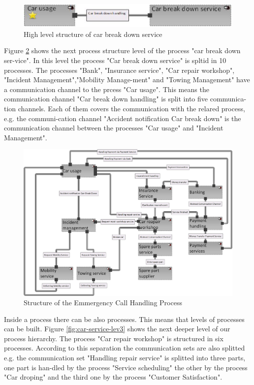 \begin{figure}[htbp]
	\centering
	\includegraphics[width=0.7\linewidth]{Figures/Chapter5/figures-hierarchy/Car-Service-Level1.jpg}
	\caption[High level structure of car break down service]{High level structure of car break down service}
	\label{fig:car-service-level1}
\end{figure}



Figure \ref{fig:car-service-leve2} shows the next process structure level of the process "car break down ser-vice". In this level the process "Car break down service" is spltid in 10 processes. The processes "Bank", "Insurance service", "Car repair workshop", "Incident Management","Mobility Manage-ment" and "Towing Management" have a communication channel to the prcess "Car usage". This means the communication channel "Car break down handling" is split into five communica-tion channels. Each of them covers the communication with the relared process, e.g. the communi-cation channel "Accident notification Car break down" is the communication channel between the processes "Car usage" and "Incident Management".\\


\begin{figure}[htbp]
	\centering
	\includegraphics[width=0.8\linewidth]{Figures/Chapter5/figures-hierarchy/Car-Service-Leve2}
	\caption[Structure of the Emmergency Call Handling Process]{Structure of the Emmergency Call Handling Process}
	\label{fig:car-service-leve2}
\end{figure}



Inside a process there can be also processes. This means that levels of processes can be built. Figure \ref{fig:car-service-lev3} shows the next deeper level of our process hierarchy. The process "Car repair workshop" is structured in six processes. According to this separation the communication sets are also splitted e.g. the communication set "Handling repair service" is splitted into three parts, one part is han-dled by the process "Service scheduling" the other by the process "Car droping" and the third one by the process "Customer Satisfaction".\\

